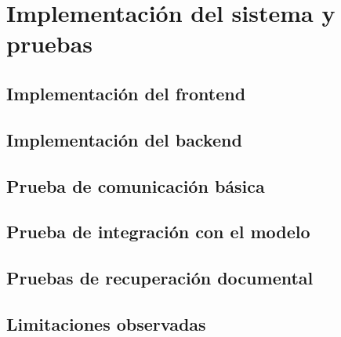 \section{Implementación del sistema y pruebas}

\subsection{Implementación del frontend}

\subsection{Implementación del backend}

\subsection{Prueba de comunicación básica}

\subsection{Prueba de integración con el modelo}

\subsection{Pruebas de recuperación documental}

\subsection{Limitaciones observadas}

